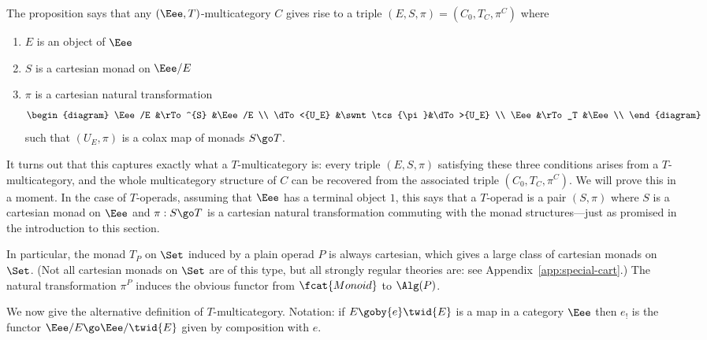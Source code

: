 The proposition says that any $(\Eee,T)$-multicategory $C$ gives rise to a
triple $(E, S, \pi) = (C_0, T_C, \pi^C)$ where
%
\begin{enumerate}
\item 	{}
$E$ is an object of $\Eee$
\item 
$S$ is a cartesian monad on $\Eee/E$
\item 	{}
$\pi$ is a cartesian natural transformation 
\[
\begin{diagram}
\Eee/E		&\rTo^{S}	&\Eee/E		\\
\dTo<{U_E}	&\swnt \tcs{\pi}&\dTo>{U_E}	\\
\Eee		&\rTo_T		&\Eee		\\
\end{diagram}
\]
such that $(U_E, \pi)$ is a colax map of monads $S \go T$.
\end{enumerate}
%
It turns out that this captures exactly what a $T$-multicategory is: every
triple $(E, S, \pi)$ satisfying these three conditions arises from a
$T$-multicategory, and the whole multicategory structure of $C$ can be
recovered from the associated triple $(C_0, T_C, \pi^C)$.  We will prove
this in a moment.  In the case of $T$-operads, assuming that $\Eee$ has a
terminal object $1$, this says that a $T$-operad is a pair $(S, \pi)$ where
$S$ is a cartesian monad on $\Eee$ and $\pi: S \go T$ is a cartesian
natural transformation commuting with the monad structures---just as
promised in the introduction to this section.

In particular, the monad $T_P$ on $\Set$ induced by a plain operad $P$ is
always cartesian, which gives a large class of cartesian monads on $\Set$.
(Not all cartesian monads on $\Set$ are of this type, but all strongly
regular theories are: see Appendix~\ref{app:special-cart}.)  The natural
transformation $\pi^P$ induces the obvious functor from $\fcat{Monoid}$ to
$\Alg(P)$.

We now give the alternative definition of $T$-multicategory.  Notation: if
$E \goby{e} \twid{E}$ is a map in a category $\Eee$ then $e_!$%
% 
% 
is the
functor $\Eee/E \go \Eee/\twid{E}$ given by composition with $e$.

